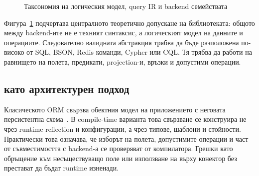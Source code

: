 \begin{figure}[H]
\centering
{}
\caption{Таксономия на логическия модел, query IR и backend семействата}
\label{fig:storage_taxonomy}
\end{figure}

Фигура~\ref{fig:storage_taxonomy} подчертава централното теоретично допускане на библиотеката: общото между backend-ите не е техният синтаксис, а логическият модел на данните и операциите. Следователно валидната абстракция трябва да бъде разположена по-високо от SQL, BSON, Redis команди, Cypher или CQL. Тя трябва да работи на равнището на полета, предикати, projection-и, връзки и допустими операции.

\subsection{\ORMName{} като архитектурен подход}

Класическото ORM свързва обектния модел на приложението с неговата персистентна схема~\cite{fowler2002}. В compile-time варианта това свързване се конструира не чрез runtime reflection и конфигурации, а чрез типове, шаблони и  стойности. Практически това означава, че изборът на полета, допустимите операции и част от съвместимостта с backend-а се проверяват от компилатора. Грешки като обръщение към несъществуващо поле или използване на  върху конектор без  престават да бъдат runtime изненади.

